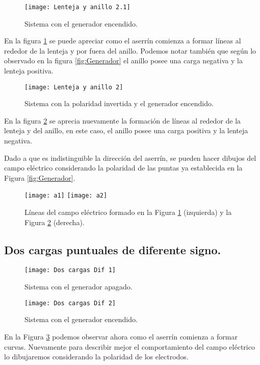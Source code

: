 \documentclass[14pt]{article}
\begin{document}
\begin{multicols}{2}
\begin{figure}[h!]
	\centering
	\texttt{[image: Lenteja y anillo 2.1]}
	\caption{Sistema con el generador encendido.}
	\label{fig:AyLE1}
\end{figure}

En la figura \ref{fig:AyLE1} se puede apreciar como el aserrín comienza a formar líneas al rededor de la lenteja y por fuera del anillo. Podemos notar también que según lo observado en la figura \ref{fig:Generador} el anillo posee una carga negativa y la lenteja positiva.


\begin{figure}[h!]
	\centering
	\texttt{[image: Lenteja y anillo 2]}
	\caption{Sistema con la polaridad invertida y el generador encendido.}
	\label{fig:AyLE2}
\end{figure}

En la figura \ref{fig:AyLE2} se aprecia nuevamente la formación de líneas al rededor de la lenteja y del anillo, en este caso, el anillo posee una carga positiva y la lenteja negativa. 

Dado a que es indistinguible la dirección del aserrín, se pueden hacer dibujos del campo eléctrico considerando la polaridad de las puntas ya establecida en la Figura \ref{fig:Generador}.

\begin{figure}[h!]
	\centering
	\texttt{[image: a1]}
	\texttt{[image: a2]}
	\caption{Líneas del campo eléctrico formado en la Figura \ref{fig:AyLE1} (izquierda) y la Figura \ref{fig:AyLE2} (derecha).}
\end{figure}


\subsection{Dos cargas puntuales de diferente signo.}

\begin{figure}[h!]
	\centering
	\texttt{[image: Dos cargas Dif 1]}
	\caption{Sistema con el generador apagado.}
\end{figure}

\begin{figure}[h!]
	\centering
	\texttt{[image: Dos cargas Dif 2]}
	\caption{Sistema con el generador encendido.}
	\label{fig:CDif1}
\end{figure}

En la Figura \ref{fig:CDif1} podemos observar ahora como el aserrín comienza a formar curvas. Nuevamente para describir mejor el comportamiento del campo eléctrico lo dibujaremos considerando la polaridad de los electrodos.


\end{multicols}
\end{document}

